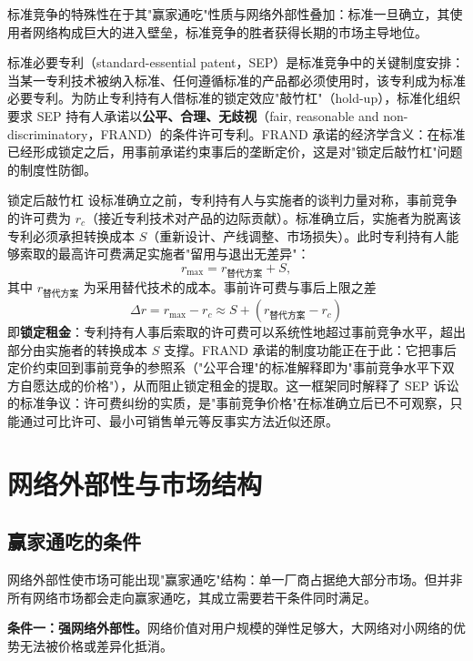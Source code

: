 标准竞争的特殊性在于其"赢家通吃"性质与网络外部性叠加：标准一旦确立，其使用者网络构成巨大的进入壁垒，标准竞争的胜者获得长期的市场主导地位。

标准必要专利（standard-essential patent，SEP）是标准竞争中的关键制度安排：当某一专利技术被纳入标准、任何遵循标准的产品都必须使用时，该专利成为标准必要专利。为防止专利持有人借标准的锁定效应"敲竹杠"（hold-up），标准化组织要求 SEP 持有人承诺以\textbf{公平、合理、无歧视}（fair, reasonable and non-discriminatory，FRAND）的条件许可专利。FRAND 承诺的经济学含义：在标准已经形成锁定之后，用事前承诺约束事后的垄断定价，这是对"锁定后敲竹杠"问题的制度性防御。

\begin{derivation}{锁定后敲竹杠}{}
设标准确立之前，专利持有人与实施者的谈判力量对称，事前竞争的许可费为 $r_c$（接近专利技术对产品的边际贡献）。标准确立后，实施者为脱离该专利必须承担转换成本 $S$（重新设计、产线调整、市场损失）。此时专利持有人能够索取的最高许可费满足实施者"留用与退出无差异"：
\[
r_{\max} = r_{\text{替代方案}} + S,
\]
其中 $r_{\text{替代方案}}$ 为采用替代技术的成本。事前许可费与事后上限之差
\[
\Delta r = r_{\max} - r_c \approx S + (r_{\text{替代方案}} - r_c)
\]
即\textbf{锁定租金}：专利持有人事后索取的许可费可以系统性地超过事前竞争水平，超出部分由实施者的转换成本 $S$ 支撑。FRAND 承诺的制度功能正在于此：它把事后定价约束回到事前竞争的参照系（"公平合理"的标准解释即为"事前竞争水平下双方自愿达成的价格"），从而阻止锁定租金的提取。这一框架同时解释了 SEP 诉讼的标准争议：许可费纠纷的实质，是"事前竞争价格"在标准确立后已不可观察，只能通过可比许可、最小可销售单元等反事实方法近似还原。
\end{derivation}

\section{网络外部性与市场结构}

\subsection{赢家通吃的条件}

网络外部性使市场可能出现"赢家通吃"结构：单一厂商占据绝大部分市场。但并非所有网络市场都会走向赢家通吃，其成立需要若干条件同时满足。

\textbf{条件一：强网络外部性。}网络价值对用户规模的弹性足够大，大网络对小网络的优势无法被价格或差异化抵消。

